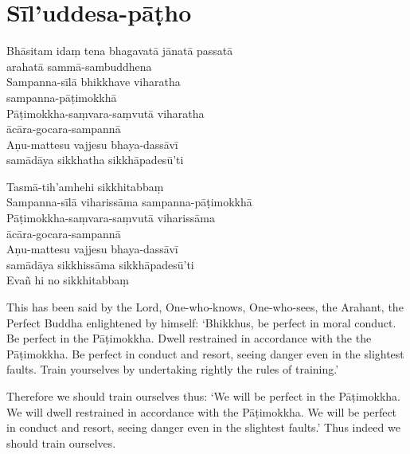 \section{Sīl'uddesa-pāṭho}

\begin{leader}
\end{leader}


Bhāsitam idaṃ tena bhagavatā jānatā passatā\\
arahatā sammā-sambuddhena\\
Sampanna-sīlā bhikkhave viharatha\\
sampanna-pāṭimokkhā\\
Pāṭimokkha-saṃvara-saṃvutā viharatha\\
ācāra-gocara-sampannā\\
Aṇu-mattesu vajjesu bhaya-dassāvī\\
samādāya sikkhatha sikkhāpadesū'ti

Tasmā-tih'amhehi sikkhitabbaṃ\\
Sampanna-sīlā viharissāma sampanna-pāṭimokkhā\\
Pāṭimokkha-saṃvara-saṃvutā viharissāma\\
ācāra-gocara-sampannā\\
Aṇu-mattesu vajjesu bhaya-dassāvī\\
samādāya sikkhissāma sikkhāpadesū'ti\\
Evañ hi no sikkhitabbaṃ


\begin{english}
  This has been said by the Lord, One-who-knows, One-who-sees, the Arahant, the
  Perfect Buddha enlightened by himself: `Bhikkhus, be perfect in moral
  conduct. Be perfect in the Pāṭimokkha. Dwell restrained in accordance with the
  the Pāṭimokkha. Be perfect in conduct and resort, seeing danger even in the
  slightest faults. Train yourselves by undertaking rightly the rules of training.'

  \bigskip

  Therefore we should train ourselves thus: `We will be perfect in the
  Pāṭimokkha. We will dwell restrained in accordance with the Pāṭimokkha. We
  will be perfect in conduct and resort, seeing danger even in the slightest
  faults.' Thus indeed we should train ourselves.
\end{english}

